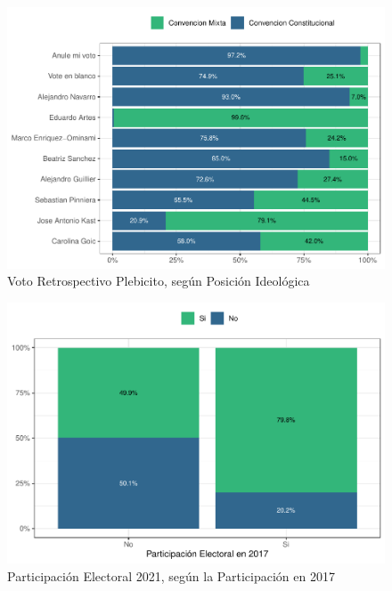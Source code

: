 \documentclass[
  12pt,
  openany]{book}
\begin{document}
\begin{figure}

{\centering \includegraphics{reporte-elsoc_files/figure-latex/presi-voto-c45-1} 

}

\caption{Voto Retrospectivo Plebicito, según Posición Ideológica}\label{fig:presi-voto-c45}
\end{figure}

\begin{figure}

{\centering \includegraphics{reporte-elsoc_files/figure-latex/2020-vs-2021-1} 

}

\caption{Participación Electoral 2021, según la Participación en 2017}\label{fig:2020-vs-2021}
\end{figure}
\end{document}
